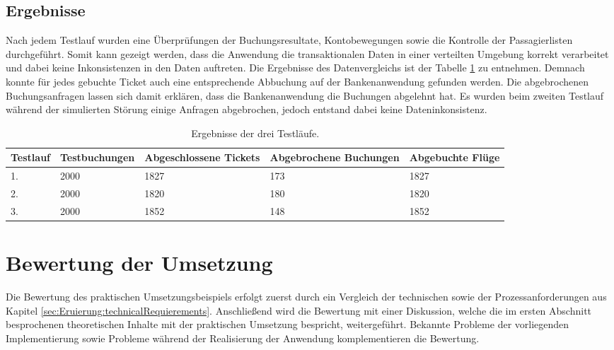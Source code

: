 \subsection{Ergebnisse}
\label{subsec:evaluation:resultsTestRuns}
Nach jedem Testlauf wurden eine Überprüfungen der Buchungsresultate, Kontobewegungen sowie die Kontrolle der Passagierlisten durchgeführt. Somit kann gezeigt werden, dass die Anwendung die transaktionalen Daten in einer verteilten Umgebung korrekt verarbeitet und dabei keine Inkonsistenzen in den Daten auftreten. Die Ergebnisse des Datenvergleichs ist der Tabelle \ref{tab:evaluation:resultsTestRuns} zu entnehmen. Demnach konnte für jedes gebuchte Ticket auch eine entsprechende Abbuchung auf der Bankenanwendung gefunden werden. Die abgebrochenen Buchungsanfragen lassen sich damit erklären, dass die Bankenanwendung die Buchungen abgelehnt hat. Es wurden beim zweiten Testlauf während der simulierten Störung einige Anfragen abgebrochen, jedoch entstand dabei keine Dateninkonsistenz.
\begin{table}
  \centering
  \begin{tabular}{p{1.5 cm} p{2.5 cm} p{2.5 cm} p{2.5 cm} p{2.5 cm}}
    Testlauf  & Testbuchungen    &  Abgeschlossene Tickets & Abgebrochene Buchungen & Abgebuchte Flüge \\ \hline
      1.   & 2000        &     1827       &   173        &     1827    \\
      2.   & 2000        &     1820       &   180        &     1820    \\
      3.   & 2000        &     1852       &   148        &     1852    
  \end{tabular}
  \caption{Ergebnisse der drei Testläufe.}
  \label{tab:evaluation:resultsTestRuns}
\end{table}

\section{Bewertung der Umsetzung}
\label{cha:rating}
Die Bewertung des praktischen Umsetzungsbeispiels erfolgt zuerst durch ein Vergleich der technischen sowie der Prozessanforderungen aus Kapitel \ref{sec:Eruierung:technicalRequierements}. Anschließend wird die Bewertung mit einer Diskussion, welche die im ersten Abschnitt besprochenen theoretischen Inhalte mit der praktischen Umsetzung bespricht, weitergeführt. Bekannte Probleme der vorliegenden Implementierung sowie Probleme während der Realisierung der Anwendung komplementieren die Bewertung.

